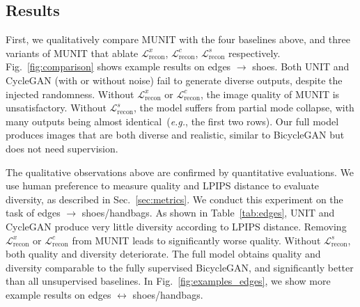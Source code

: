 \documentclass[runningheads]{llncs}
\begin{document}
\subsection{Results}
First, we qualitatively compare MUNIT with the four baselines above, and three variants of MUNIT that ablate $\mathcal{L}^{x}_{\text{recon}}$, $\mathcal{L}^{c}_{\text{recon}}$, $\mathcal{L}^{s}_{\text{recon}}$ respectively. Fig.~\ref{fig:comparison} shows example results on edges $\rightarrow$ shoes. Both UNIT and CycleGAN (with or without noise) fail to generate diverse outputs, despite the injected randomness. Without $\mathcal{L}^{x}_{\text{recon}}$ or $\mathcal{L}^{c}_{\text{recon}}$, the image quality of MUNIT  is unsatisfactory. Without $\mathcal{L}^{s}_{\text{recon}}$, the model suffers from partial mode collapse, with many outputs being almost identical~(\textit{e.g.}, the first two rows). Our full model produces images that are both diverse and realistic, similar to BicycleGAN but does not need supervision. 
	
	The qualitative observations above are confirmed by quantitative evaluations. We use human preference to measure quality and LPIPS distance to evaluate diversity, as described in Sec.~\ref{sec:metrics}. We conduct this experiment on the task of edges $\rightarrow$ shoes/handbags. As shown in Table~\ref{tab:edges}, UNIT and CycleGAN produce very little diversity according to LPIPS distance. Removing $\mathcal{L}^{x}_{\text{recon}}$ or $\mathcal{L}^{c}_{\text{recon}}$ from MUNIT leads to significantly worse quality. Without $\mathcal{L}^{s}_{\text{recon}}$, both quality and diversity deteriorate. The full model obtains quality and diversity comparable to the fully supervised BicycleGAN, and significantly better than all unsupervised baselines.
	In Fig.~\ref{fig:examples_edges}, we show more example results on edges $\leftrightarrow$ shoes/handbags. 
\end{document}
